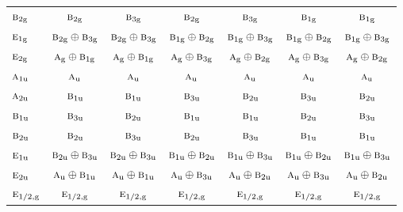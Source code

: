 \documentclass[10pt,a4paper]{article}
\numberwithin{equation}{section}
\newcommand{\irr}[1]{\text{\normalfont\scshape #1}}
\newcommand{\ptag}[1]{\mathrm{#1}}
\begin{document}
{\begin{longtable}{@{}lcccccc@{}}
$\irr{b}_{2\ptag{g}}$ & $\irr{b}_{2\ptag{g}}$ & $\irr{b}_{3\ptag{g}}$ & $\irr{b}_{2\ptag{g}}$ & $\irr{b}_{3\ptag{g}}$ & $\irr{b}_{1\ptag{g}}$ & $\irr{b}_{1\ptag{g}}$\\
$\irr{e}_{1\ptag{g}}$ & $\irr{b}_{2\ptag{g}}\oplus \irr{b}_{3\ptag{g}}$ & $\irr{b}_{2\ptag{g}}\oplus \irr{b}_{3\ptag{g}}$ & $\irr{b}_{1\ptag{g}}\oplus \irr{b}_{2\ptag{g}}$ & $\irr{b}_{1\ptag{g}}\oplus \irr{b}_{3\ptag{g}}$ & $\irr{b}_{1\ptag{g}}\oplus \irr{b}_{2\ptag{g}}$ & $\irr{b}_{1\ptag{g}}\oplus \irr{b}_{3\ptag{g}}$\\
$\irr{e}_{2\ptag{g}}$ & $\irr{a}_{\ptag{g}}\oplus \irr{b}_{1\ptag{g}}$ & $\irr{a}_{\ptag{g}}\oplus \irr{b}_{1\ptag{g}}$ & $\irr{a}_{\ptag{g}}\oplus \irr{b}_{3\ptag{g}}$ & $\irr{a}_{\ptag{g}}\oplus \irr{b}_{2\ptag{g}}$ & $\irr{a}_{\ptag{g}}\oplus \irr{b}_{3\ptag{g}}$ & $\irr{a}_{\ptag{g}}\oplus \irr{b}_{2\ptag{g}}$\\
$\irr{a}_{1\ptag{u}}$ & $\irr{a}_{\ptag{u}}$ & $\irr{a}_{\ptag{u}}$ & $\irr{a}_{\ptag{u}}$ & $\irr{a}_{\ptag{u}}$ & $\irr{a}_{\ptag{u}}$ & $\irr{a}_{\ptag{u}}$\\
$\irr{a}_{2\ptag{u}}$ & $\irr{b}_{1\ptag{u}}$ & $\irr{b}_{1\ptag{u}}$ & $\irr{b}_{3\ptag{u}}$ & $\irr{b}_{2\ptag{u}}$ & $\irr{b}_{3\ptag{u}}$ & $\irr{b}_{2\ptag{u}}$\\
$\irr{b}_{1\ptag{u}}$ & $\irr{b}_{3\ptag{u}}$ & $\irr{b}_{2\ptag{u}}$ & $\irr{b}_{1\ptag{u}}$ & $\irr{b}_{1\ptag{u}}$ & $\irr{b}_{2\ptag{u}}$ & $\irr{b}_{3\ptag{u}}$\\
$\irr{b}_{2\ptag{u}}$ & $\irr{b}_{2\ptag{u}}$ & $\irr{b}_{3\ptag{u}}$ & $\irr{b}_{2\ptag{u}}$ & $\irr{b}_{3\ptag{u}}$ & $\irr{b}_{1\ptag{u}}$ & $\irr{b}_{1\ptag{u}}$\\
$\irr{e}_{1\ptag{u}}$ & $\irr{b}_{2\ptag{u}}\oplus \irr{b}_{3\ptag{u}}$ & $\irr{b}_{2\ptag{u}}\oplus \irr{b}_{3\ptag{u}}$ & $\irr{b}_{1\ptag{u}}\oplus \irr{b}_{2\ptag{u}}$ & $\irr{b}_{1\ptag{u}}\oplus \irr{b}_{3\ptag{u}}$ & $\irr{b}_{1\ptag{u}}\oplus \irr{b}_{2\ptag{u}}$ & $\irr{b}_{1\ptag{u}}\oplus \irr{b}_{3\ptag{u}}$\\
$\irr{e}_{2\ptag{u}}$ & $\irr{a}_{\ptag{u}}\oplus \irr{b}_{1\ptag{u}}$ & $\irr{a}_{\ptag{u}}\oplus \irr{b}_{1\ptag{u}}$ & $\irr{a}_{\ptag{u}}\oplus \irr{b}_{3\ptag{u}}$ & $\irr{a}_{\ptag{u}}\oplus \irr{b}_{2\ptag{u}}$ & $\irr{a}_{\ptag{u}}\oplus \irr{b}_{3\ptag{u}}$ & $\irr{a}_{\ptag{u}}\oplus \irr{b}_{2\ptag{u}}$\\
$\irr{e}_{1/2,\ptag{g}}$ & $\irr{e}_{1/2,\ptag{g}}$ & $\irr{e}_{1/2,\ptag{g}}$ & $\irr{e}_{1/2,\ptag{g}}$ & $\irr{e}_{1/2,\ptag{g}}$ & $\irr{e}_{1/2,\ptag{g}}$ & $\irr{e}_{1/2,\ptag{g}}$\\

\end{longtable}}
\end{document}
